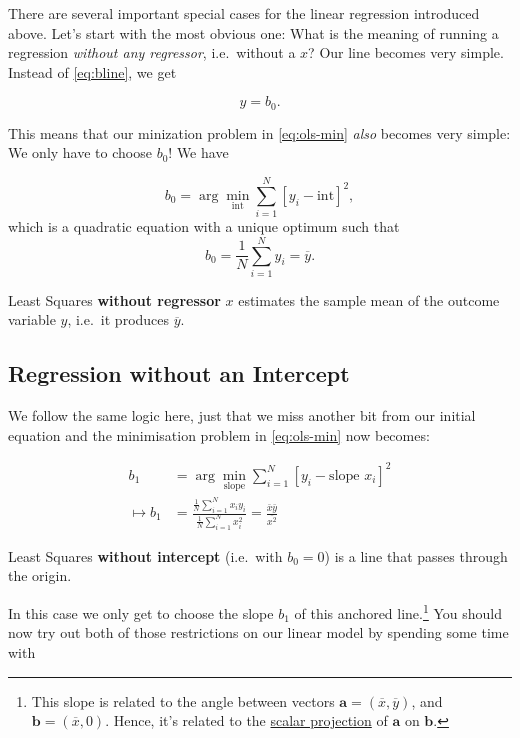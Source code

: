 \documentclass[]{book}
\let\rmarkdownfootnote\footnote%
\def\footnote{\protect\rmarkdownfootnote}
\newenvironment{tip}{\begin{tcolorbox}[colback=green!5!white,colframe=green]}{\end{tcolorbox}}
\begin{document}
There are several important special cases for the linear regression introduced above. Let's start with the most obvious one: What is the meaning of running a regression \emph{without any regressor}, i.e.~without a \(x\)? Our line becomes very simple. Instead of \eqref{eq:bline}, we get

\begin{equation}
y = b_0. \label{eq:b0line}
\end{equation}

This means that our minization problem in \eqref{eq:ols-min} \emph{also} becomes very simple: We only have to choose \(b_0\)! We have

\[
b_0 = \arg\min_{\text{int}} \sum_{i=1}^N \left[y_i - \text{int}\right]^2,
\]
which is a quadratic equation with a unique optimum such that
\[
b_0 = \frac{1}{N} \sum_{i=1}^N y_i = \overline{y}.
\]

\begin{tip}
Least Squares \textbf{without regressor} \(x\) estimates the sample mean
of the outcome variable \(y\), i.e.~it produces \(\overline{y}\).
\end{tip}

\hypertarget{regression-without-an-intercept}{%
\subsection{Regression without an Intercept}\label{regression-without-an-intercept}}

We follow the same logic here, just that we miss another bit from our initial equation and the minimisation problem in \eqref{eq:ols-min} now becomes:

\begin{align}
b_1 &= \arg\min_{\text{slope}} \sum_{i=1}^N \left[y_i - \text{slope } x_i \right]^2\\
\mapsto b_1 &= \frac{\frac{1}{N}\sum_{i=1}^N x_i y_i}{\frac{1}{N}\sum_{i=1}^N x_i^2} = \frac{\bar{x} \bar{y}}{\overline{x^2}} \label{eq:b1line}
\end{align}

\begin{tip}
Least Squares \textbf{without intercept} (i.e.~with \(b_0=0\)) is a line
that passes through the origin.
\end{tip}

In this case we only get to choose the slope \(b_1\) of this anchored line.\footnote{This slope is related to the angle between vectors \(\mathbf{a} = (\overline{x},\overline{y})\), and \(\mathbf{b} = (\overline{x},0)\). Hence, it's related to the \href{https://en.wikipedia.org/wiki/Scalar_projection}{scalar projection} of \(\mathbf{a}\) on \(\mathbf{b}\).} You should now try out both of those restrictions on our linear model by spending some time with
\end{document}
